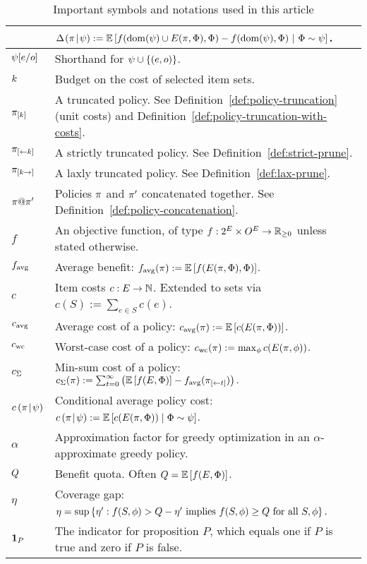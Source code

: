 \begin{table}[p]
\begin{tabular}{|l|p{5in}|}
                              & $\Delta \hspace{-0.3mm} \left( { {\pi}\! \mid \! {{\color{black}{\ensuremath{\psi}}}} } \right)   :=
                              \mathbb{E}\left[f(\operatorname{dom}({\color{black}{\ensuremath{\psi}}}) \cup E({\pi}, {{\color{black}{\ensuremath{\Phi}}}}), {\color{black}{\ensuremath{\Phi}}}) -
   f(\operatorname{dom}({\color{black}{\ensuremath{\psi}}}), {\color{black}{\ensuremath{\Phi}}})\ | \ {\color{black}{\ensuremath{\Phi}}}\sim{\color{black}{\ensuremath{\psi}}}\right]$. \\
\hline
${{\color{black}{\ensuremath{\psi}}}}\!\left[{e}/{o}\right]$ & Shorthand for ${\color{black}{\ensuremath{\psi}}} \cup \left\{(e, o)\right\}$.\\
\hline
$k$ & Budget on the cost of selected item sets.\\
\hline
$ \pi_{[{k}]} $ & A truncated policy.  See Definition~\vref{def:policy-truncation} (unit costs) and Definition~\vref{def:policy-truncation-with-costs}. \\
\hline
$ \pi_{[\gets{k}] }$ & A strictly truncated policy.  See Definition~\vref{def:strict-prune}.\\
\hline
$ \pi_{[{k}\to]}$ & A laxly truncated policy.  See Definition~\vref{def:lax-prune}.\\
\hline
${\pi}@{\pi'}$ & Policies $\pi$ and $\pi'$ concatenated together.  See Definition~\vref{def:policy-concatenation}.\\
\hline
$f$ & An objective function, of type $f:2^{E} \times O^{E} \to \mathbb{R}_{\ge 0}$ unless stated otherwise.\\
\hline
$f_{\text{avg}}$ & Average benefit: $f_{\text{avg}}(\pi) := \mathbb{E}\left[f(E({\pi}, {{\color{black}{\ensuremath{\Phi}}}}), {\color{black}{\ensuremath{\Phi}}})\right]$.\\
\hline
$c$ & Item costs $c:E \to \mathbb{N}$.  Extended to sets via $c(S) := \sum_{e \in S} c(e)$. \\
\hline
${c_{\text{avg}}}$ &  Average cost of a policy: ${c_{\text{avg}}{(\pi)}} := \mathbb{E}\left[c(E({\pi}, {{\color{black}{\ensuremath{\Phi}}}}))\right]$.\\
\hline
${c_{\text{wc}}}$ &  Worst-case cost of a policy: ${c_{\text{wc}}{(\pi)}} := \max_{{\color{black}{\ensuremath{\phi}}}}{c(E({\pi}, {{\color{black}{\ensuremath{\phi}}}}))}$.\\
\hline
$c_{\Sigma}$ &  Min-sum cost of a policy: $c_{\Sigma}\! \left( {\pi} \right)  := \sum_{t =  0}^{\infty}  \left( {\mathbb{E}\left[f(E, {\color{black}{\ensuremath{\Phi}}})\right] -
      f_{\text{avg}}( \pi_{[\gets{t}] })} \right) .$ \\
\hline
$c \left( { {\pi} \! \mid \! {{\color{black}{\ensuremath{\psi}}}} } \right)  $ & Conditional average policy cost:
$c \left( { {\pi} \! \mid \! {{\color{black}{\ensuremath{\psi}}}} } \right)   :=
\mathbb{E}\left[c(E({\pi}, {{\color{black}{\ensuremath{\Phi}}}}))  \mid  {\color{black}{\ensuremath{\Phi}}} \sim  {\color{black}{\ensuremath{\psi}}}\right]$. \ignore{\gimmespace} \\
\hline
$\alpha$ & Approximation factor for greedy optimization in an $\alpha$-approximate greedy policy.\\
\hline
$Q$ & Benefit quota.  Often $Q = \mathbb{E}\left[f(E, {\color{black}{\ensuremath{\Phi}}})\right]$.\\
\hline
$\eta$ & Coverage gap: $\eta = \sup \left\{ \eta'  :  f(S, {\color{black}{\ensuremath{\phi}}}) > Q
  - \eta' \text{ implies }f(S, {\color{black}{\ensuremath{\phi}}}) \ge Q \text{ for all }S, {\color{black}{\ensuremath{\phi}}} \right\}$.\\
\hline
$\mathbf{1}_{P}$ & The indicator for proposition $P$, which equals one if $P$ is true and
zero if $P$ is false.\\
\hline    
\end{tabular}
 \caption{Important symbols and notations used in this article}  \label{table:symbol-table}
\end{table}

%

%
%
%
%
